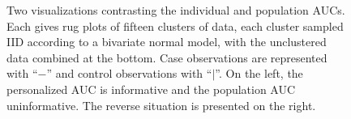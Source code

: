 \documentclass[12pt]{article}
\begin{document}
\begin{figure}[!tbp]
  \centering
  \hfill
  \caption{Two visualizations contrasting the individual and
    population AUCs. Each gives rug plots of fifteen clusters of data, each cluster sampled IID
    according to a bivariate normal model, with the unclustered
    data combined at the bottom. Case observations are represented with ``$-$'' and
    control observations with ``$|$''. On the left, the personalized AUC is
    informative and the population AUC uninformative. The reverse situation is
    presented on the right.}  \label{fig:comparison}
\end{figure}
\end{document}
